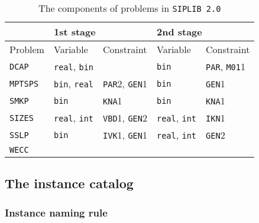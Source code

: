 \begin{table}[H]
	\centering
	\caption{The components of problems in \texttt{SIPLIB 2.0}}
	\label{table:prob_class}
	\begin{tabular}{@{}lllll@{}}
		\toprule
		& \multicolumn{2}{l}{1st stage}                              & \multicolumn{2}{l}{2nd stage}                             \\ \midrule
		Problem & Variable                    & Constraint                   & Variable                    & Constraint                  \\ \midrule
		\texttt{DCAP}    & \texttt{real}, \texttt{bin} &                              & \texttt{bin}                & \texttt{PAR}, \texttt{M01}1 \\
		\texttt{MPTSPS}  & \texttt{bin}, \texttt{real} & \texttt{PAR}2, \texttt{GEN}1 & \texttt{bin}                & \texttt{GEN}1               \\
		\texttt{SMKP}    & \texttt{bin}                & \texttt{KNA}1                & \texttt{bin}                & \texttt{KNA}1               \\
		\texttt{SIZES}   & \texttt{real}, \texttt{int} & \texttt{VBD}1, \texttt{GEN}2 & \texttt{real}, \texttt{int} & \texttt{IKN}1               \\
		\texttt{SSLP}    & \texttt{bin}                & \texttt{IVK}1, \texttt{GEN}1 & \texttt{real}, \texttt{int} & \texttt{GEN}2               \\
		\texttt{WECC}    &                             &                              &                             &                             \\ \bottomrule
	\end{tabular}

\end{table}

\subsection{The instance catalog}

\subsubsection{Instance naming rule}

